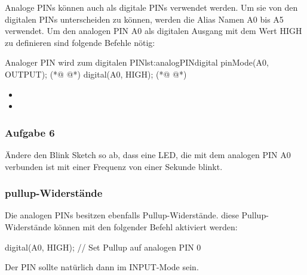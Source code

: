 Analoge PINs können auch als digitale PINs verwendet werden. Um sie von den digitalen PINs unterscheiden zu können, werden die Alias Namen A0 bis A5 verwendet. Um den analogen PIN A0 als digitalen Ausgang mit dem Wert HIGH zu definieren sind folgende Befehle nötig: 
\begin{multicols}{2}
\null\vfill
\begin{arduinoCode}{Analoger PIN wird zum digitalen PIN}{lst:analogPINdigital}
pinMode(A0, OUTPUT); (*@  @*)
digital(A0, HIGH); (*@  @*)
\end{arduinoCode}
\vfill\null 
\columnbreak

\null\vfill
\begin{itemize}
  \itemsep15pt
  \item[] 
  \item[] 
\end{itemize}
\vfill \null


\end{multicols}

\subsubsection{Aufgabe 6}
Ändere den Blink Sketch so ab, dass eine LED, die mit dem analogen PIN A0 verbunden ist mit einer Frequenz von einer Sekunde blinkt.


\subsubsection{pullup-Widerstände} 

Die analogen PINs besitzen ebenfalls Pullup-Widerstände. diese Pullup-Widerstände können mit den folgender Befehl aktiviert werden: 
\begin{arduinoCode}{}{}
digital(A0, HIGH); // Set Pullup auf analogen PIN 0 
\end{arduinoCode}
Der PIN sollte natürlich dann im INPUT-Mode sein. 


